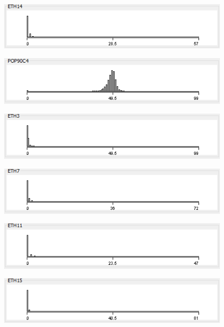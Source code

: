 \begin{figure}
\includegraphics{./images/expl_rep/Cattura3-0-4}
\end{figure}
\begin{figure}
\includegraphics{./images/expl_rep/Cattura3-1-0}
\end{figure}
\begin{figure}
\includegraphics{./images/expl_rep/Cattura3-1-1}
\end{figure}
\begin{figure}
\includegraphics{./images/expl_rep/Cattura3-1-2}
\end{figure}
\begin{figure}
\includegraphics{./images/expl_rep/Cattura3-1-3}
\end{figure}
\begin{figure}
\includegraphics{./images/expl_rep/Cattura3-1-4}
\end{figure}
